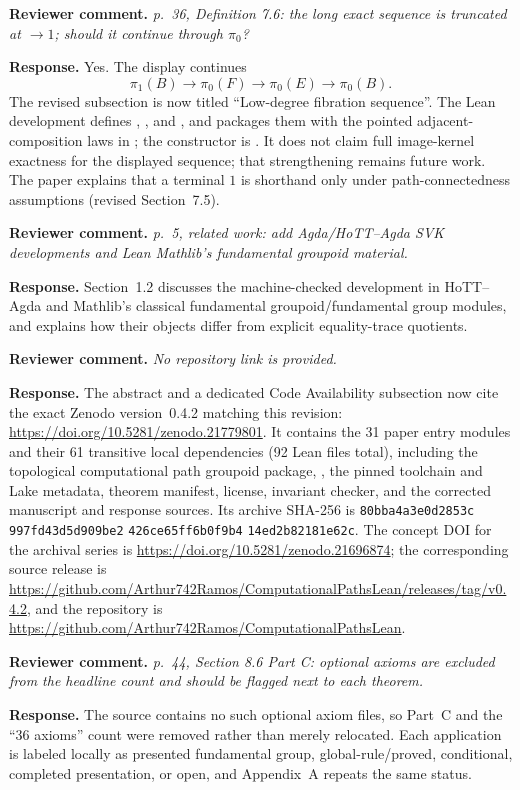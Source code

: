 \documentclass[11pt]{article}
\newcommand{\review}[1]{\par\medskip\noindent
  \textbf{\color{blue!55!black}Reviewer comment.} \emph{#1}\par}
\newcommand{\response}{\par\smallskip\noindent
  \textbf{\color{green!35!black}Response.} }
\begin{document}
\review{p.~36, Definition 7.6: the long exact sequence is truncated at
\(\to1\); should it continue through \(\pi_0\)?}
\response
Yes.  The display continues
\[
\pi_1(B)\to\pi_0(F)\to\pi_0(E)\to\pi_0(B).
\]
The revised subsection is now titled ``Low-degree fibration sequence''.  The
Lean development defines ,
, and , and packages them with
the pointed adjacent-composition laws in
; the constructor is
.  It does not claim full image-kernel
exactness for the displayed sequence; that strengthening remains future work.
The paper explains that a terminal \(1\) is shorthand only under
path-connectedness assumptions (revised Section~7.5).

\review{p.~5, related work: add Agda/HoTT--Agda SVK developments and Lean
Mathlib's fundamental groupoid material.}
\response
Section~1.2 discusses the machine-checked  development in
HoTT--Agda and Mathlib's classical fundamental groupoid/fundamental group
modules, and explains how their objects differ from explicit equality-trace
quotients.

\review{No repository link is provided.}
\response
The abstract and a dedicated Code Availability subsection now cite the exact
Zenodo version~0.4.2 matching this revision:
\url{https://doi.org/10.5281/zenodo.21779801}.
It contains the 31 paper entry modules and their 61 transitive local
dependencies (92 Lean files total), including the topological computational
path groupoid package, , the pinned toolchain and
Lake metadata, theorem manifest, license, invariant checker, and the corrected
manuscript and response sources.  Its archive SHA-256 is
\texttt{80bba4a3e0d2853c}\allowbreak
\texttt{997fd43d5d909be2}\allowbreak
\texttt{426ce65ff6b0f9b4}\allowbreak
\texttt{14ed2b82181e62c}.  The concept
DOI for the archival series is
\url{https://doi.org/10.5281/zenodo.21696874}; the corresponding source release
is
\url{https://github.com/Arthur742Ramos/ComputationalPathsLean/releases/tag/v0.4.2},
and the repository is
\url{https://github.com/Arthur742Ramos/ComputationalPathsLean}.

\review{p.~44, Section 8.6 Part C: optional axioms are excluded from the
headline count and should be flagged next to each theorem.}
\response
The source contains no such optional axiom files, so Part~C and
the ``36 axioms'' count were removed rather than merely relocated.  Each
application is labeled locally as presented fundamental group,
global-rule/proved, conditional, completed presentation, or open, and
Appendix~A repeats the same status.
\end{document}
